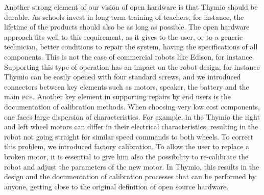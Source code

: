 \documentclass[letterpaper, 10 pt, conference]{ieeeconf}  %
\begin{document}

Another strong element of our vision of open hardware is that Thymio should be durable.
As schools invest in long term training of teachers, for instance, the lifetime of the products should also be as long as possible. 
The open hardware approach fits well to this requirement, as it gives to the user, or to a generic technician, better conditions to repair the system, having the specifications of all components. This is not the case of commercial robots like Edison, for instance.
Supporting this type of operation has an impact on the robot design; for instance Thymio can be easily opened with four standard screws, and we introduced connectors between key elements such as motors, speaker, the battery and the main \textsc{pcb}.
Another key element in supporting repairs by end users is the documentation of calibration methods. 
When choosing very low cost components, one faces large dispersion of characteristics. 
For example, in the Thymio the right and left wheel motors can differ in their electrical characteristics, resulting in the robot not going straight for similar speed commands to both wheels.
To correct this problem, we introduced factory calibration. %
To allow the user to replace a broken motor, it is essential to give him also the possibility to re-calibrate the robot and adjust the parameters of the new motor.
In Thymio, this results in the design and the documentation of calibration processes that can be performed by anyone, getting close to the original definition of open source hardware.
\end{document}
